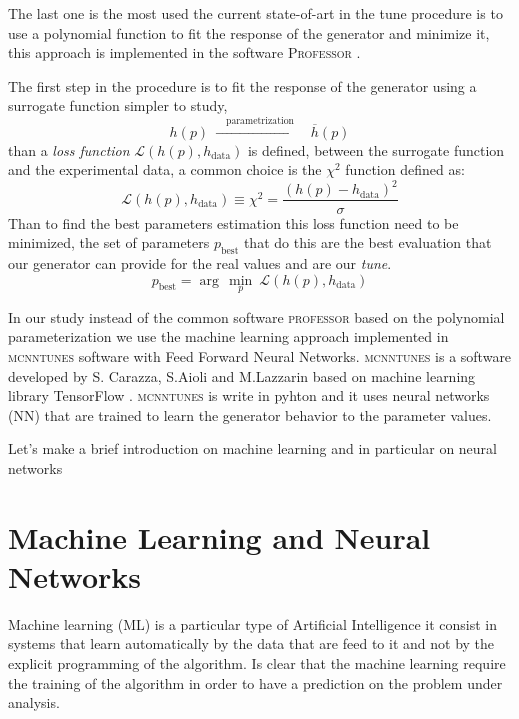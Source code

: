 The last one is the most used the current state-of-art in the tune procedure is to use a polynomial function to fit the response of the generator and minimize it, this approach is implemented in the software \textsc{Professor} \cite{Buckley:2009bj}. 

The first step in the procedure is to fit the response of the generator using a surrogate function simpler to study,
\begin{equation}
	h(p)\ \xrightarrow{\quad \text{parametrization}\quad }\ \overline{h}(p)
\end{equation}
than a \textit{loss function} $\mathcal{L}(h(p),h_{\text{data}})$ is defined, between the surrogate function and the experimental data, a common choice is the $\chi^2$ function defined as:
\begin{equation}
	\mathcal{L}(h(p),h_{\text{data}})\equiv \chi^2=\frac{(h(p)-h_{\text{data}})^2}{\sigma}
\end{equation}
Than to find the best parameters estimation this loss function need to be minimized, the set of parameters $p_{\text{best}}$ that do this are the best evaluation that our generator can provide for the real values and are our \textit{tune}.
\begin{equation}
	p_{\text{best}}=\arg\,\min_p\ \mathcal{L}(h(p),h_{\text{data}})
\end{equation}

In our study instead of the common software \textsc{professor} based on the polynomial parameterization we use the machine learning approach implemented in \textsc{mcnntunes} software %
with Feed Forward Neural Networks. \textsc{mcnntunes} is a software developed by S. Carazza, S.Aioli and M.Lazzarin \cite{MCNNTUNESarticle} based on machine learning library TensorFlow \cite{tensorflow2015-whitepaper}. \textsc{mcnntunes} is write in pyhton and it uses neural networks (NN) that are trained to learn the generator behavior to the parameter values.

Let's make a brief introduction on machine learning and in particular on neural networks

\section{Machine Learning and Neural Networks}
  
Machine learning (ML) is a particular type of Artificial Intelligence it consist in systems that learn automatically by the data that are feed to it and not by the explicit programming of the algorithm. Is clear that the machine learning require the training of the algorithm in order to have a prediction on the problem under analysis.

